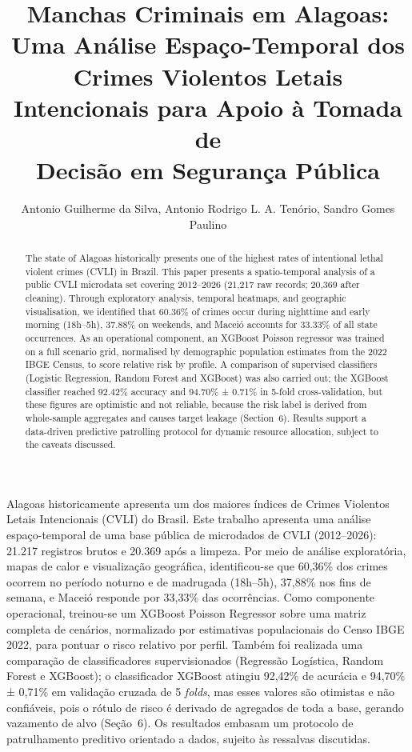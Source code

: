 \documentclass[12pt]{article}
\title{Manchas Criminais em Alagoas: Uma Análise Espaço-Temporal dos\\
Crimes Violentos Letais Intencionais para Apoio à Tomada de\\
Decisão em Segurança Pública}
\author{Antonio Guilherme da Silva\inst{1}, Antonio Rodrigo L. A. Tenório\inst{1},
  Sandro Gomes Paulino\inst{1}}
\begin{document}
\maketitle
\begin{abstract}
  The state of Alagoas historically presents one of the highest rates of
  intentional lethal violent crimes (CVLI) in Brazil. This paper presents a
  spatio-temporal analysis of a public CVLI microdata set covering 2012--2026
  (21,217 raw records; 20,369 after cleaning). Through exploratory analysis,
  temporal heatmaps, and geographic visualisation, we identified that 60.36\%
  of crimes occur during nighttime and early morning (18h--5h), 37.88\% on
  weekends, and Maceió accounts for 33.33\% of all state occurrences. As an
  operational component, an XGBoost Poisson regressor was trained on a full
  scenario grid, normalised by demographic population estimates from the 2022
  IBGE Census, to score relative risk by profile. A comparison of supervised
  classifiers (Logistic Regression, Random Forest and XGBoost) was also carried
  out; the XGBoost classifier reached 92.42\% accuracy and 94.70\% ± 0.71\% in
  5-fold cross-validation, but these figures are optimistic and not reliable,
  because the risk label is derived from whole-sample aggregates and causes
  target leakage (Section~6). Results support a data-driven predictive
  patrolling protocol for dynamic resource allocation, subject to the caveats
  discussed.
\end{abstract}
\begin{resumo}
  Alagoas historicamente apresenta um dos maiores índices de Crimes Violentos
  Letais Intencionais (CVLI) do Brasil. Este trabalho apresenta uma análise
  espaço-temporal de uma base pública de microdados de CVLI (2012--2026):
  21.217 registros brutos e 20.369 após a limpeza. Por meio de análise
  exploratória, mapas de calor e visualização geográfica, identificou-se que
  60,36\% dos crimes ocorrem no período noturno e de madrugada (18h--5h),
  37,88\% nos fins de semana, e Maceió responde por 33,33\% das ocorrências.
  Como componente operacional, treinou-se um XGBoost Poisson Regressor sobre
  uma matriz completa de cenários, normalizado por estimativas populacionais
  do Censo IBGE 2022, para pontuar o risco relativo por perfil. Também foi
  realizada uma comparação de classificadores supervisionados (Regressão
  Logística, Random Forest e XGBoost); o classificador XGBoost atingiu 92,42\%
  de acurácia e 94,70\% ± 0,71\% em validação cruzada de 5 \textit{folds}, mas
  esses valores são otimistas e não confiáveis, pois o rótulo de risco é
  derivado de agregados de toda a base, gerando vazamento de alvo (Seção~6).
  Os resultados embasam um protocolo de patrulhamento preditivo orientado a
  dados, sujeito às ressalvas discutidas.
\end{resumo}
\end{document}
